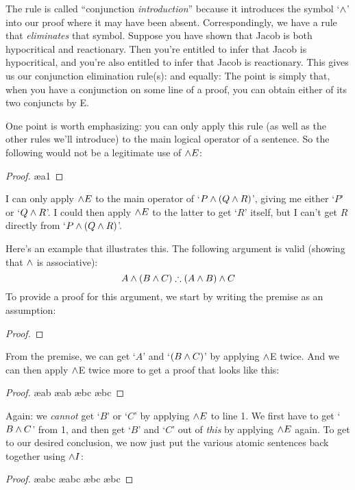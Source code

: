 The rule is called ``conjunction \emph{introduction}'' because it introduces the symbol `$\wedge$' into our proof where it may have been absent. Correspondingly, we have a rule that \emph{eliminates} that symbol.  Suppose you have shown that Jacob is both hypocritical and reactionary. Then you're entitled to infer that Jacob is hypocritical, and you're also entitled to infer that Jacob is reactionary. This gives us our conjunction elimination rule(s):
and equally:
The point is simply that, when you have a conjunction on some line of a proof, you can obtain either of its two conjuncts by {\eand}E. 

One point is worth emphasizing: you can only apply this rule (as well as the other rules we'll introduce) to the main logical operator of a sentence.  So the following would not be a legitimate use of $\wedge E$:

\begin{proof}
	 \ae{a1}
\end{proof}
I can only apply $\wedge E$ to the main operator of `$P \wedge (Q \wedge R)$', giving me either `$P$' or `$Q \wedge R$'.  I could then apply $\wedge E$ to the latter to get `$R$' itself, but I can't get $R$ directly from `$P \wedge (Q \wedge R)$'.  

Here's an example that illustrates this. The following argument is valid (showing that $\wedge$ is associative):
	$$A \wedge (B \wedge C) \therefore (A \wedge B) \wedge C$$
To provide a proof for this argument, we start by writing the premise as an assumption:
\begin{proof}
\end{proof}
From the premise, we can get `$A$' and `$(B \wedge C)$' by applying $\wedge$E twice. And we can then apply $\wedge$E twice more to get a proof that looks like this:
\begin{proof}
	 \ae{ab}
	 \ae{ab}
	 \ae{bc}
	 \ae{bc}
\end{proof}
Again: we \emph{cannot} get `$B$' or `$C$' by applying $\wedge E$ to line 1.  We first have to get `$B \wedge C$' from 1, and then get `$B$' and `$C$' out of \emph{this} by applying $\wedge E$ again. To get to our desired conclusion, we now just put the various atomic sentences back together using $\wedge I$:
\begin{proof}
	 \ae{abc}
	 \ae{abc}
	 \ae{bc}
	 \ae{bc}
\end{proof}

